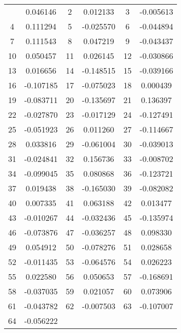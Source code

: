 \documentclass[12pt]{article}
\begin{document}
\begin{longtable}{@{}cc|cc|cc@{}}
\bottomrule
\endlastfoot
1 & 0.046146 & 2 & 0.012133 & 3 & -0.005613 \\
4 & 0.111294 & 5 & -0.025570 & 6 & -0.044894 \\
7 & 0.111543 & 8 & 0.047219 & 9 & -0.043437 \\
10 & 0.050457 & 11 & 0.026145 & 12 & -0.030866 \\
13 & 0.016656 & 14 & -0.148515 & 15 & -0.039166 \\
16 & -0.107185 & 17 & -0.075023 & 18 & 0.000439 \\
19 & -0.083711 & 20 & -0.135697 & 21 & 0.136397 \\
22 & -0.027870 & 23 & -0.017129 & 24 & -0.127491 \\
25 & -0.051923 & 26 & 0.011260 & 27 & -0.114667 \\
28 & 0.033816 & 29 & -0.061004 & 30 & -0.039013 \\
31 & -0.024841 & 32 & 0.156736 & 33 & -0.008702 \\
34 & -0.099045 & 35 & 0.080868 & 36 & -0.123721 \\
37 & 0.019438 & 38 & -0.165030 & 39 & -0.082082 \\
40 & 0.007335 & 41 & 0.063188 & 42 & 0.013477 \\
43 & -0.010267 & 44 & -0.032436 & 45 & -0.135974 \\
46 & -0.073876 & 47 & -0.036257 & 48 & 0.098330 \\
49 & 0.054912 & 50 & -0.078276 & 51 & 0.028658 \\
52 & -0.011435 & 53 & -0.064576 & 54 & 0.026223 \\
55 & 0.022580 & 56 & 0.050653 & 57 & -0.168691 \\
58 & -0.037035 & 59 & 0.021057 & 60 & 0.073906 \\
61 & -0.043782 & 62 & -0.007503 & 63 & -0.107007 \\
64 & -0.056222 &  &  &  &  \\

\end{longtable}
\end{document}
